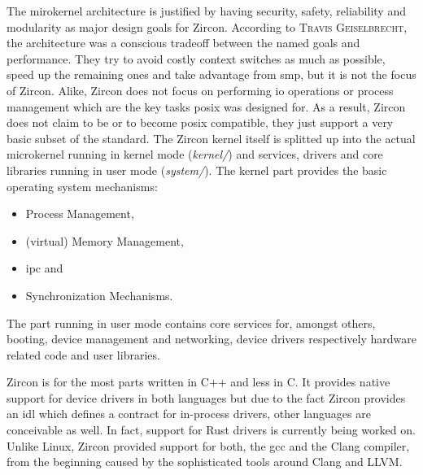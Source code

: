 The mirokernel architecture is justified by having security, safety, reliability and modularity as major design goals for Zircon.
According to \textsc{Travis Geiselbrecht}, the architecture was a conscious tradeoff between the named goals and performance\cite{chat-zircon-arch}.
They try to avoid costly context switches as much as possible, speed up the remaining ones and take advantage from \acf{smp}, but it is not the focus of Zircon.
Alike, Zircon does not focus on performing \ac{io} operations or process management which are the key tasks \ac{posix} was designed for\cite{chat-zircon-arch}.
As a result, Zircon does not claim to be or to become \ac{posix} compatible, they just support a very basic subset of the standard\cite{zircon-libc-posix}.
The Zircon kernel itself is splitted up into the actual microkernel running in kernel mode (\textit{kernel/}) and services, drivers and core libraries running in user mode (\textit{system/})\cite{zircon-intro}.
The kernel part provides the basic operating system mechanisms: 
\begin{itemize}
    \item Process Management,
    \item (virtual) Memory Management,
    \item \acl{ipc} and
    \item Synchronization Mechanisms\cite{zircon-intro}.
\end{itemize}
The part running in user mode contains core services for, amongst others, booting, device management and networking, device drivers respectively hardware related code and user libraries.

Zircon is for the most parts written in C++ and less in C.
It provides native support for device drivers in both languages but due to the fact Zircon provides an \ac{idl} which defines a contract for in-process drivers, other languages are conceivable as well.
In fact, support for Rust drivers is currently being worked on\cite{chat-zircon-arch}.
Unlike Linux, Zircon provided support for both, the \ac{gcc} and the Clang compiler, from the beginning caused by the sophisticated tools around Clang and LLVM\@.


